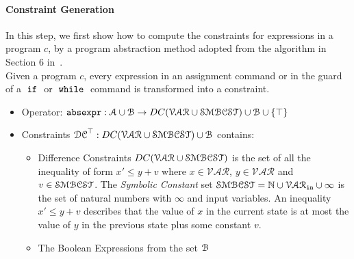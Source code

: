 \paragraph{Constraint Generation}
In this step, we first show how to compute the constraints for expressions in a program $c$,
by a program abstraction method adopted from the
algorithm in Section 6 in~\cite{sinn2017complexity}.
\\
Given a program $c$,
every expression in an assignment command or in the guard of a $\;\mathtt{if}\;$ or $\;\mathtt{while}\;$ command
is transformed into a constraint.

\begin{itemize}
\item Operator: $\mathtt{abs}{\mathtt{expr}} : \mathcal{A} \cup \mathcal{B} \to DC(\mathcal{VAR}  \cup \mathcal{SMBCST})\cup \mathcal{B} \cup \{\top\}$
%
\item Constraints $\mathcal{DC}^{\top}: DC(\mathcal{VAR}  \cup \mathcal{SMBCST}) \cup \mathcal{B}$  contains:
%
\begin{itemize}
\item Difference Constraints $DC(\mathcal{VAR}  \cup \mathcal{SMBCST})$ is the set of all the inequality of
form $x' \leq y + v$ where $x \in \mathcal{VAR} $, 
$y \in \mathcal{VAR}$ and $v \in \mathcal{SMBCST}$.
The \emph{Symbolic Constant} set $\mathcal{SMBCST} = \mathbb{N} \cup \mathcal{VAR}_{\mathtt{in}} \cup{\infty}$
is the set of natural numbers with $\infty$ and input variables.
An inequality $x' \leq y + v$ describes that the value of $x$ in the current state is
at most the value of $y$ in the previous state plus some constant $v$.
%
\item The Boolean Expressions from the set $\mathcal{B}$
%
\end{itemize}
\end{itemize}

